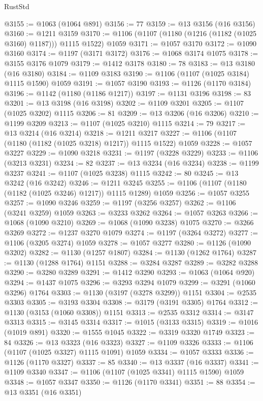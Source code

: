 \begin{lexlean}{RustStd}
\begin{coremodule}
@3155 := @1063 (@1064 @891)
@3156 := 77
@3159 := @13 @3156 (@16 @3156)
@3160 := @1211 @3159
@3170 := @1106 (@1107 (@1180 (@1216 (@1182 (@1025 @3160) @1187))) @1115 @1522) @1059
@3171 := @1057 @3170
@3172 := @1090 @3160
@3174 := @1197 (@3171 @3172)
@3176 := @1068 @3174 @1075
@3178 := @3155 @3176 @1079
@3179 := @1412 @3178
@3180 := 78
@3183 := @13 @3180 (@16 @3180)
@3184 := @1109 @3183
@3190 := @1106 (@1107 (@1025 @3184) @1115 @1590) @1059
@3191 := @1057 @3190
@3193 := @1126 (@1170 @3184)
@3196 := @1142 (@1180 (@1186 @1217))
@3197 := @1131 @3196
@3198 := 83
@3201 := @13 @3198 (@16 @3198)
@3202 := @1109 @3201
@3205 := @1107 (@1025 @3202) @1115
@3206 := 81
@3209 := @13 @3206 (@16 @3206)
@3210 := @1199 @3209
@3213 := @1107 (@1025 @3210) @1115
@3214 := 79
@3217 := @13 @3214 (@16 @3214)
@3218 := @1211 @3217
@3227 := @1106 (@1107 (@1180 (@1182 (@1025 @3218) @1217)) @1115 @1522) @1059
@3228 := @1057 @3227
@3229 := @1090 @3218
@3231 := @1197 (@3228 @3229)
@3233 := @1106 (@3213 @3231)
@3234 := 82
@3237 := @13 @3234 (@16 @3234)
@3238 := @1199 @3237
@3241 := @1107 (@1025 @3238) @1115
@3242 := 80
@3245 := @13 @3242 (@16 @3242)
@3246 := @1211 @3245
@3255 := @1106 (@1107 (@1180 (@1182 (@1025 @3246) @1217)) @1115 @1289) @1059
@3256 := @1057 @3255
@3257 := @1090 @3246
@3259 := @1197 (@3256 @3257)
@3262 := @1106 (@3241 @3259) @1059
@3263 := @3233 @3262
@3264 := @1057 @3263
@3266 := @1068 (@1090 @3210)
@3269 := @1068 (@1090 @3238) @1075
@3270 := @3266 @3269
@3272 := @1237 @3270 @1079
@3274 := @1197 (@3264 @3272)
@3277 := @1106 (@3205 @3274) @1059
@3278 := @1057 @3277
@3280 := @1126 (@1090 @3202)
@3282 := @1130 (@1257 @1807)
@3284 := @1130 (@1262 @1764)
@3287 := @1130 (@1288 @1764) @1151
@3288 := @3284 @3287
@3289 := @3282 @3288
@3290 := @3280 @3289
@3291 := @1412 @3290
@3293 := @1063 (@1064 @920)
@3294 := @1437 @1075
@3296 := @3293 @3294 @1079
@3299 := @3291 (@1060 @3296) @1764
@3303 := @1130 (@3197 (@3278 @3299)) @1151
@3304 := @2535 @3303
@3305 := @3193 @3304
@3308 := @3179 (@3191 @3305) @1764
@3312 := @1130 (@3153 (@1060 @3308)) @1151
@3313 := @2535 @3312
@3314 := @3147 @3313
@3315 := @3145 @3314
@3317 := @1015 (@3133 @3315)
@3319 := @1016 (@1019 @891)
@3320 := @1555 @1045
@3322 := @3319 @3320 @1749
@3323 := 84
@3326 := @13 @3323 (@16 @3323)
@3327 := @1109 @3326
@3333 := @1106 (@1107 (@1025 @3327) @1115 @1091) @1059
@3334 := @1057 @3333
@3336 := @1126 (@1170 @3327)
@3337 := 85
@3340 := @13 @3337 (@16 @3337)
@3341 := @1109 @3340
@3347 := @1106 (@1107 (@1025 @3341) @1115 @1590) @1059
@3348 := @1057 @3347
@3350 := @1126 (@1170 @3341)
@3351 := 88
@3354 := @13 @3351 (@16 @3351)

\end{coremodule}
\end{lexlean}
